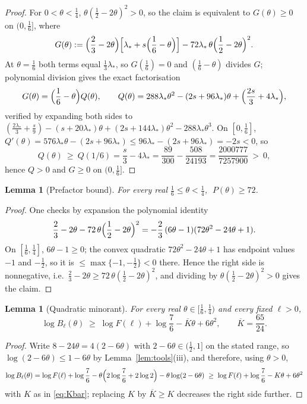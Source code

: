 \documentclass[11pt]{amsart}
\newtheorem{lemma}[theorem]{Lemma}
\theoremstyle{remark}
\begin{document}
\begin{proof}
For $0<\theta<\tfrac14$, $\theta(\tfrac12-2\theta)^2>0$, so the claim is equivalent to $G(\theta)\ge0$ on $(0,\tfrac16]$, where
\[
        G(\theta)
        :=\Bigl(\frac23-2\theta\Bigr)
        \Bigl[\lambda_*+s\Bigl(\frac16-\theta\Bigr)\Bigr]
        -72\lambda_*\,\theta\Bigl(\frac12-2\theta\Bigr)^2 .
\]
At $\theta=\tfrac16$ both terms equal $\frac13\lambda_*$, so $G(\tfrac16)=0$ and $(\tfrac16-\theta)$ divides $G$; polynomial division gives the exact factorisation
\[
        G(\theta)=\Bigl(\frac16-\theta\Bigr)Q(\theta),
        \qquad
        Q(\theta)
        =288\lambda_*\theta^2-(2s+96\lambda_*)\theta
        +\Bigl(\frac{2s}3+4\lambda_*\Bigr),
\]
verified by expanding both sides to
$(\frac{2\lambda_*}3+\frac s9)-(s+20\lambda_*)\theta+(2s+144\lambda_*)\theta^2-288\lambda_*\theta^3$.
On $[0,\tfrac16]$, $Q'(\theta)=576\lambda_*\theta-(2s+96\lambda_*)\le96\lambda_*-(2s+96\lambda_*)=-2s<0$, so
\[
        Q(\theta)\ \ge\ Q(1/6)
        =\frac s3-4\lambda_*
        =\frac{89}{300}-\frac{508}{24193}
        =\frac{2000777}{7257900}\ >\ 0,
\]
hence $Q>0$ and $G\ge0$ on $(0,\tfrac16]$.
\end{proof}

\begin{lemma}[Prefactor bound]\label{lem:P72}
For every real $\frac16\le\theta<\frac14$, $\;P(\theta)\ge72$.
\end{lemma}

\begin{proof}
One checks by expansion the polynomial identity
\[
        \frac23-2\theta-72\,\theta\Bigl(\frac12-2\theta\Bigr)^2
        =-\frac23\,(6\theta-1)(72\theta^2-24\theta+1).
\]
On $[\tfrac16,\tfrac14]$, $6\theta-1\ge0$; the convex quadratic $72\theta^2-24\theta+1$ has endpoint values $-1$ and $-\tfrac12$, so it is $\le\max\{-1,-\tfrac12\}<0$ there.  Hence the right side is nonnegative, i.e.\ $\frac23-2\theta\ge72\,\theta(\frac12-2\theta)^2$, and dividing by $\theta(\frac12-2\theta)^2>0$ gives the claim.
\end{proof}

\begin{lemma}[Quadratic minorant]\label{lem:quad}
For every real $\theta\in[\tfrac16,\tfrac14)$ and every fixed $\ell>0$,
\[
        \log B_\ell(\theta)\;\ge\;
        \log F(\ell)+\log\frac76-\overline K\theta+6\theta^2,
        \qquad \overline K=\frac{65}{24}.
\]
\end{lemma}

\begin{proof}
Write $8-24\theta=4(2-6\theta)$ with $2-6\theta\in(\tfrac12,1]$ on the stated range, so $\log(2-6\theta)\le1-6\theta$ by Lemma~\ref{lem:tools}(iii), and therefore, using $\theta>0$,
\[
        \log B_\ell(\theta)
        =\log F(\ell)+\log\frac76
        -\theta\Bigl(2\log\frac76+2\log2\Bigr)-\theta\log(2-6\theta)
        \;\ge\;\log F(\ell)+\log\frac76-K\theta+6\theta^2
\]
with $K$ as in \eqref{eq:Kbar}; replacing $K$ by $\overline K\ge K$ decreases the right side further.
\end{proof}
\end{document}
